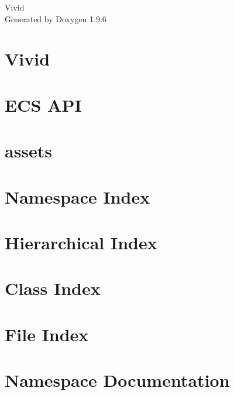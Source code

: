 \documentclass[twoside]{book}
\newcommand{\+}{\discretionary{\mbox{\scriptsize$\hookleftarrow$}}{}{}}
\newcommand{\clearemptydoublepage}{%
    \newpage{\pagestyle{empty}\cleardoublepage}%
  }
\begin{document}
  \raggedbottom
    \hypersetup{pageanchor=false,
                bookmarksnumbered=true,
                pdfencoding=unicode
               }
  \begin{titlepage}
  \vspace*{7cm}
  \begin{center}%
  {\Large Vivid}\\
  \vspace*{1cm}
  {\large Generated by Doxygen 1.9.6}\\
  \end{center}
  \end{titlepage}
  \clearemptydoublepage
  \tableofcontents
  \clearemptydoublepage
  \hypersetup{pageanchor=true}
\chapter{Vivid}
\label{index}\hypertarget{index}{}
\chapter{ECS API}
\label{_e_c_s_a_p_i}

\chapter{assets}
\label{md_src_editor_assets_assets}

\chapter{Namespace Index}

\chapter{Hierarchical Index}

\chapter{Class Index}

\chapter{File Index}

\chapter{Namespace Documentation}






\end{document}
